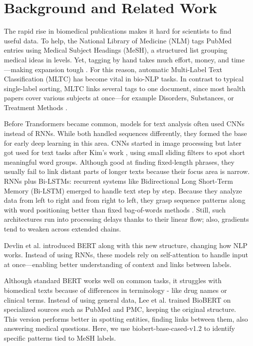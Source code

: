 \documentclass[11pt]{article}
\begin{document}
\section{Background and Related Work}

The rapid rise in biomedical publications makes it hard for scientists to find useful data. To
help, the National Library of Medicine (NLM) tags PubMed entries using Medical Subject Headings
(MeSH), a structured list grouping medical ideas in levels. Yet, tagging by hand takes much effort,
money, and time---making expansion tough \cite{mao2017}. For this reason, automatic Multi-Label
Text Classification (MLTC) has become vital in bio-NLP tasks. In contrast to typical single-label
sorting, MLTC links several tags to one document, since most health papers cover various subjects
at once---for example Disorders, Substances, or Treatment Methods \cite{tsoumakas2007}.

Before Transformers became common, models for text analysis often used CNNs instead of RNNs. While
both handled sequences differently, they formed the base for early deep learning in this area.
CNNs started in image processing but later got used for text tasks after Kim's work \cite{kim2014},
using small sliding filters to spot short meaningful word groups. Although good at finding
fixed-length phrases, they usually fail to link distant parts of longer texts because their focus
area is narrow. RNNs plus Bi-LSTMs: recurrent systems like Bidirectional Long Short-Term Memory
(Bi-LSTM) emerged to handle text step by step. Because they analyze data from left to right and
from right to left, they grasp sequence patterns along with word positioning better than fixed
bag-of-words methods \cite{hochreiter1997}. Still, such architectures run into processing delays
thanks to their linear flow; also, gradients tend to weaken across extended chains.

Devlin et al. \cite{devlin2019} introduced BERT along with this new structure, changing how NLP
works. Instead of using RNNs, these models rely on self-attention to handle input at
once---enabling better understanding of context and links between labels.

Although standard BERT works well on common tasks, it struggles with biomedical texts because of
differences in terminology - like drug names or clinical terms. Instead of using general data,
Lee et al. \cite{lee2020} trained BioBERT on specialized sources such as PubMed and PMC, keeping
the original structure. This version performs better in spotting entities, finding links between
them, also answering medical questions. Here, we use biobert-base-cased-v1.2 to identify specific
patterns tied to MeSH labels.
\end{document}
